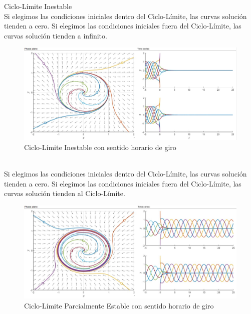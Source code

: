 \documentclass[12pt,a4paper]{report} %
\begin{document}
	\newpage
		
	{\Large\textbullet\quad Ciclo-Límite Inestable}\\[0.5cm]
	
	Si elegimos las condiciones iniciales dentro del Ciclo-Límite, las curvas solución tienden a cero. Si elegimos las condiciones iniciales fuera del Ciclo-Límite, las curvas solución tienden a infinito.
	
	\begin{figure}[h]
		\centering
		\includegraphics[width=1\textwidth]{cli.jpg}
		\caption{Ciclo-Límite Inestable con sentido horario de giro}
		\label{fig:cli}
	\end{figure}\smallskip
	
	\vspace{0.5cm}{\Large\textbullet\quad Ciclo-Límite Parcialmente Estable}\\[0.5cm]
	
	Si elegimos las condiciones iniciales dentro del Ciclo-Límite, las curvas solución tienden a cero. Si elegimos las condiciones iniciales fuera del Ciclo-Límite, las curvas solución tienden al Ciclo-Límite.
	
	\begin{figure}[h]
		\centering
		\includegraphics[width=1\textwidth]{clpe.jpg}
		\caption{Ciclo-Límite Parcialmente Estable con sentido horario de giro}
		\label{fig:clpe}
	\end{figure}\smallskip
	\newpage
	
\end{document}
